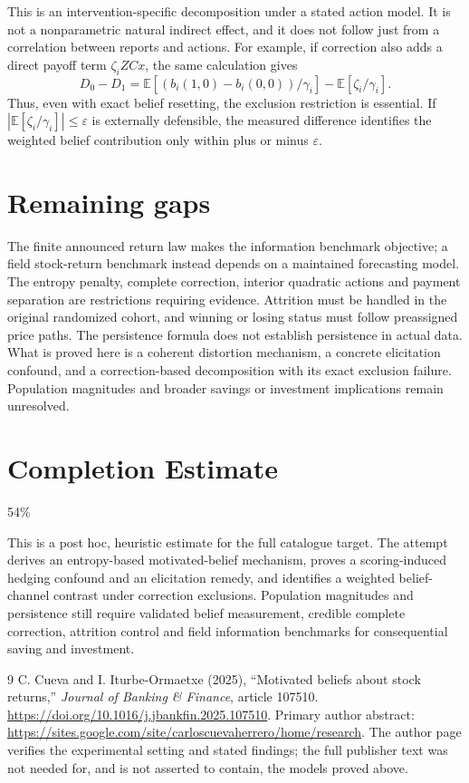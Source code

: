 \documentclass[11pt,a4paper]{article}
\theoremstyle{definition}
\theoremstyle{remark}
\newcommand{\E}{\mathbb E}
\begin{document}
This is an intervention-specific decomposition under a stated action model. It is not a nonparametric natural indirect effect, and it does not follow just from a correlation between reports and actions. For example, if correction also adds a direct payoff term $\zeta_i ZC x$, the same calculation gives
\[
 D_0-D_1=\E[(b_i(1,0)-b_i(0,0))/\gamma_i]
                   -\E[\zeta_i/\gamma_i].
\]
Thus, even with exact belief resetting, the exclusion restriction is essential. If $|\E[\zeta_i/\gamma_i]|\leq\varepsilon$ is externally defensible, the measured difference identifies the weighted belief contribution only within plus or minus $\varepsilon$.

\section{Remaining gaps}
The finite announced return law makes the information benchmark objective; a field stock-return benchmark instead depends on a maintained forecasting model. The entropy penalty, complete correction, interior quadratic actions and payment separation are restrictions requiring evidence. Attrition must be handled in the original randomized cohort, and winning or losing status must follow preassigned price paths. The persistence formula does not establish persistence in actual data. What is proved here is a coherent distortion mechanism, a concrete elicitation confound, and a correction-based decomposition with its exact exclusion failure. Population magnitudes and broader savings or investment implications remain unresolved.

\section{Completion Estimate}
54\%

This is a post hoc, heuristic estimate for the full catalogue target.
The attempt derives an entropy-based motivated-belief mechanism, proves a scoring-induced hedging confound and an elicitation remedy, and identifies a weighted belief-channel contrast under correction exclusions. Population magnitudes and persistence still require validated belief measurement, credible complete correction, attrition control and field information benchmarks for consequential saving and investment.

\begin{thebibliography}{9}
 C. Cueva and I. Iturbe-Ormaetxe (2025), ``Motivated beliefs about stock returns,'' \emph{Journal of Banking \& Finance}, article 107510. \url{https://doi.org/10.1016/j.jbankfin.2025.107510}. Primary author abstract: \url{https://sites.google.com/site/carloscuevaherrero/home/research}. The author page verifies the experimental setting and stated findings; the full publisher text was not needed for, and is not asserted to contain, the models proved above.
\end{thebibliography}
\end{document}
